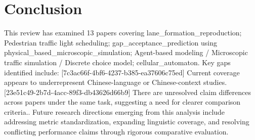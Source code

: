 \documentclass{article}
\begin{document}
\section{Conclusion}
This review has examined 13 papers covering lane_formation_reproduction; Pedestrian traffic light scheduling; gap_acceptance_prediction using physical_based_microscopic_simulation; Agent-based modeling / Microscopic traffic simulation / Discrete choice model; cellular_automaton. Key gaps identified include: [7c3ac66f-4bf6-4237-b385-ea37606c75ed] Current coverage appears to underrepresent Chinese-language or Chinese-context studies. [23e51c49-2b7d-4acc-89f3-db43626d66b9] There are unresolved claim differences across papers under the same task, suggesting a need for clearer comparison criteria.. Future research directions emerging from this analysis include addressing metric standardization, expanding linguistic coverage, and resolving conflicting performance claims through rigorous comparative evaluation.
\end{document}
